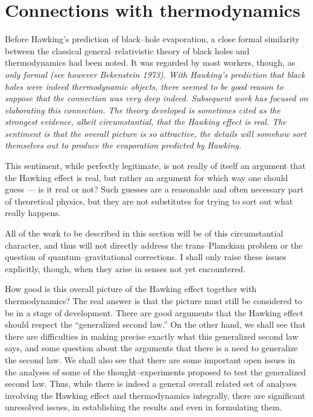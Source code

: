 \section{Connections with thermodynamics}

Before Hawking's prediction of black--hole evaporation, a close formal
similarity between the classical general--relativistic theory of black holes
and thermodynamics had been noted.  It was regarded by most workers, though,
as \it only \rm formal (see however Bekenstein 1973).  With Hawking's
prediction that black holes were indeed thermodynamic objects, there seemed to
be good reason to suppose that the connection was very deep indeed.  Subsequent
work has focused on elaborating this connection.  The theory developed is
sometimes cited as the strongest evidence, albeit circumstantial, that the
Hawking effect is real.  The sentiment is that the overall picture is so
attractive, the details will somehow sort themselves out to produce the
evaporation predicted by Hawking.

This sentiment, while perfectly legitimate, is not really of itself an
argument that the Hawking effect is real, but rather an argument for which way
one should guess --- is it real or not?  Such guesses are a reasonable and
often necessary part of theoretical physics, but they are not substitutes for
trying to sort out what really happens.

All of the work to be described in this section will be of this circumstantial
character, and thus will not directly address the trans--Planckian problem or
the question of quantum--gravitational corrections.  I shall only raise these
issues explicitly, though, when they arise in senses not yet encountered. 

How good is this overall picture of the Hawking effect together with
thermodynamics?  The real answer is that the picture must still be considered
to be in a stage of development.  There are good arguments that the Hawking
effect should respect the ``generalized second law.'' On the other hand, we
shall see that there are difficulties in making precise exactly what this
generalized second law says, and some question about the arguments that there
is a need to generalize the second law. We shall also see that there are some
important open issues in the analyses of some of the thought--experiments
proposed to test the generalized second law.  Thus, while there is indeed a
general overall related set of analyses involving the Hawking effect and
thermodynamics integrally, there are significant unresolved issues, in
establishing the results and even in formulating them.

